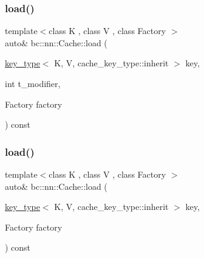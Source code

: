 \mbox{\label{structbc_1_1nn_1_1Cache_ae86e94f09dad94f95ed404493bf276b1}} 
\subsubsection{\texorpdfstring{load()}{load()}\hspace{0.1cm}{\footnotesize\ttfamily [2/8]}}
{\footnotesize\ttfamily template$<$class K , class V , class Factory $>$ \\
auto\& bc\+::nn\+::\+Cache\+::load (\begin{DoxyParamCaption}\item[{\hyperlink{structbc_1_1nn_1_1Cache_aedd77c5710dcb5f9edd8ecb3c3041048}{key\+\_\+type}$<$ K, V, cache\+\_\+key\+\_\+type\+::inherit $>$}]{key,  }\item[{int}]{t\+\_\+modifier,  }\item[{Factory}]{factory }\end{DoxyParamCaption}) const\hspace{0.3cm}{\ttfamily [inline]}}

\mbox{\label{structbc_1_1nn_1_1Cache_a1e82cb0f2285c277b716f5509b785b76}} 
\subsubsection{\texorpdfstring{load()}{load()}\hspace{0.1cm}{\footnotesize\ttfamily [3/8]}}
{\footnotesize\ttfamily template$<$class K , class V , class Factory $>$ \\
auto\& bc\+::nn\+::\+Cache\+::load (\begin{DoxyParamCaption}\item[{\hyperlink{structbc_1_1nn_1_1Cache_aedd77c5710dcb5f9edd8ecb3c3041048}{key\+\_\+type}$<$ K, V, cache\+\_\+key\+\_\+type\+::inherit $>$}]{key,  }\item[{Factory}]{factory }\end{DoxyParamCaption}) const\hspace{0.3cm}{\ttfamily [inline]}}

\mbox{\label{structbc_1_1nn_1_1Cache_acbee3bebd817f7bfebe16311a6e1f091}} 
